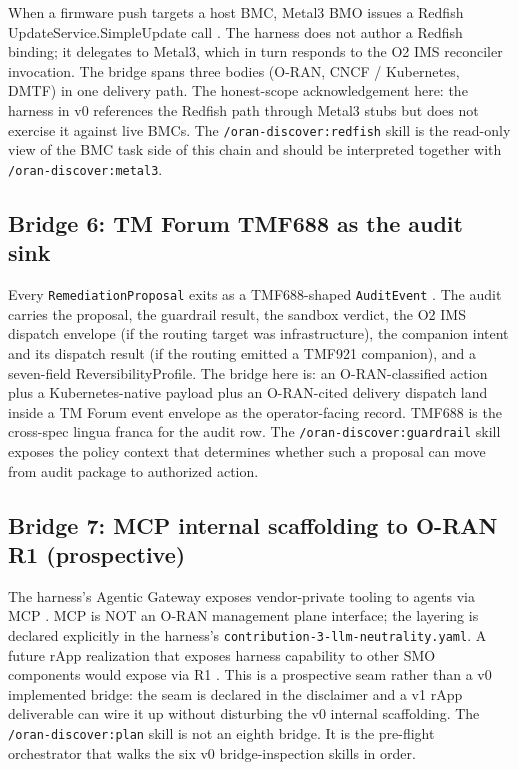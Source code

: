 \documentclass[twocolumn,10pt,a4paper]{article}
\begin{document}
When a firmware push targets a host BMC, Metal3 BMO \cite{metal3_bmo} issues a Redfish UpdateService.SimpleUpdate call \cite{dmtf_redfish}. The harness does not author a Redfish binding; it delegates to Metal3, which in turn responds to the O2 IMS reconciler invocation. The bridge spans three bodies (O-RAN, CNCF / Kubernetes, DMTF) in one delivery path. The honest-scope acknowledgement here: the harness in v0 references the Redfish path through Metal3 stubs but does not exercise it against live BMCs. The \texttt{/oran-discover:redfish} skill is the read-only view of the BMC task side of this chain and should be interpreted together with \texttt{/oran-discover:metal3}.

\subsection{Bridge 6: TM Forum TMF688 as the audit sink}

Every \texttt{RemediationProposal} exits as a TMF688-shaped \texttt{AuditEvent} \cite{tmf688}. The audit carries the proposal, the guardrail result, the sandbox verdict, the O2 IMS dispatch envelope (if the routing target was infrastructure), the companion intent and its dispatch result (if the routing emitted a TMF921 companion), and a seven-field ReversibilityProfile. The bridge here is: an O-RAN-classified action plus a Kubernetes-native payload plus an O-RAN-cited delivery dispatch land inside a TM Forum event envelope as the operator-facing record. TMF688 is the cross-spec lingua franca for the audit row. The \texttt{/oran-discover:guardrail} skill exposes the policy context that determines whether such a proposal can move from audit package to authorized action.

\subsection{Bridge 7: MCP internal scaffolding to O-RAN R1 (prospective)}

The harness's Agentic Gateway exposes vendor-private tooling to agents via MCP \cite{mcp_spec,mcp_python_sdk,fastmcp}. MCP is NOT an O-RAN management plane interface; the layering is declared explicitly in the harness's \texttt{contribution-3-llm-neutrality.yaml}. A future rApp realization that exposes harness capability to other SMO components would expose via R1 \cite{oran_r1}. This is a prospective seam rather than a v0 implemented bridge: the seam is declared in the disclaimer and a v1 rApp deliverable can wire it up without disturbing the v0 internal scaffolding. The \texttt{/oran-discover:plan} skill is not an eighth bridge. It is the pre-flight orchestrator that walks the six v0 bridge-inspection skills in order.
\end{document}
